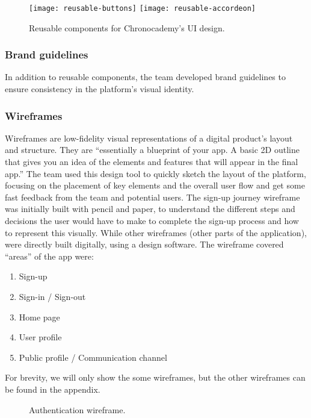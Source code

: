 \begin{figure}[h]
    \centering
    \texttt{[image: reusable-buttons]}
    \texttt{[image: reusable-accordeon]}
    \caption{Reusable components for Chronocademy's UI design.}
    \label{fig:figure20}
\end{figure}

\subsubsection{Brand guidelines}\label{subsubsec:brand-guidelines}
In addition to reusable components, the team developed brand guidelines to ensure consistency in the platform's visual identity.
\newpage

\newpage
\subsubsection{Wireframes}\label{subsubsec:wireframes}
Wireframes are low-fidelity visual representations of a digital product's layout and structure.
They are ``essentially a blueprint of your app.
A basic 2D outline that gives you an idea of the elements and features that will appear in the final app.''\cite[Wireframes]{lowFidelity}
The team used this design tool to quickly sketch the layout of the platform, focusing on the placement of key elements and the overall user flow and get some fast feedback from the team and potential users.\newline\newline
The sign-up journey wireframe was initially built with pencil and paper, to understand the different steps and decisions the user would have to make to complete the sign-up process and how to represent this visually.
While other wireframes (other parts of the application), were directly built digitally, using a design software.
The wireframe covered ``areas'' of the app were:
\begin{enumerate}
    \item Sign-up
    \item Sign-in / Sign-out
    \item Home page
    \item User profile
    \item Public profile / Communication channel
\end{enumerate}
For brevity, we will only show the some wireframes, but the other wireframes can be found in the appendix.\newline
\begin{figure}[h]
    \centering
    \caption{Authentication wireframe.}
    \label{fig:figure21}
\end{figure}
